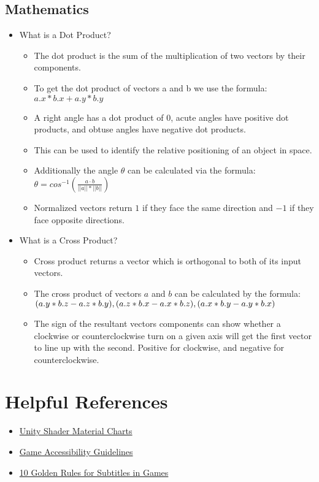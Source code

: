 \documentclass{article}
\begin{document}
\subsection{Mathematics}
\begin{itemize}
    \item What is a Dot Product?
    \begin{itemize}
        \item The dot product is the sum of the multiplication of two vectors by their components.
        \item To get the dot product of vectors a and b we use the formula: $a.x*b.x + a.y*b.y$
        \item A right angle has a dot product of $0$, acute angles have positive dot products, and obtuse angles have negative dot products.
        \item This can be used to identify the relative positioning of an object in space.
        \item Additionally the angle $\theta$ can be calculated via the formula: $\theta = cos^{-1}(\frac{a \cdot b}{||a||*||b||})$
        \item Normalized vectors return $1$ if they face the same direction and $-1$ if they face opposite directions.
    \end{itemize}
    \item What is a Cross Product?
    \begin{itemize}
        \item Cross product returns a vector which is orthogonal to both of its input vectors.
        \item The cross product of vectors $a$ and $b$ can be calculated by the formula:
        $\newline (a.y*b.z - a.z*b.y), (a.z*b.x - a.x*b.z), (a.x*b.y - a.y*b.x)$
        \item The sign of the resultant vectors components can show whether a clockwise or counterclockwise turn on a given axis will get the first vector to line up with the second. Positive for clockwise, and negative for counterclockwise.
    \end{itemize}
\end{itemize}

\newpage
\section{Helpful References}
\begin{itemize}
    \item \href{https://docs.unity3d.com/Manual/StandardShaderMaterialCharts.html}{Unity Shader Material Charts}
    \item
    \href{https://gameaccessibilityguidelines.com/full-list/}{Game Accessibility Guidelines}
    \item
    \href{https://80.lv/articles/10-golden-rules-on-subtitles-for-games/}{10 Golden Rules for Subtitles in Games}
\end{itemize}
\end{document}
